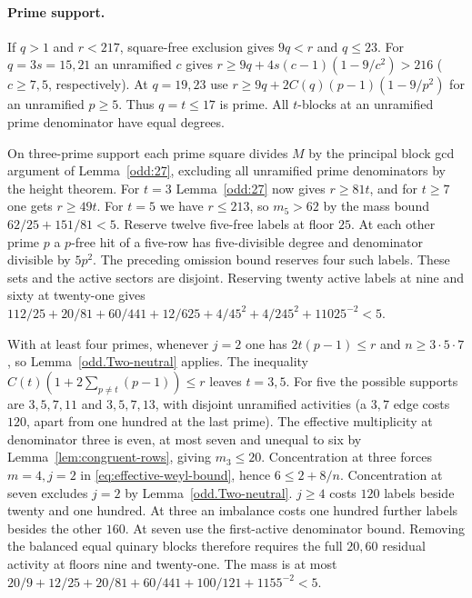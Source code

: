\documentclass[11pt]{amsart}
\numberwithin{equation}{section}
\theoremstyle{definition}
\theoremstyle{plain}
\begin{document}
\paragraph{Prime support.}
If $q>1$ and $r<217$,
square-free exclusion gives $9q<r$ and $q\le23$. For $q=3s=15,21$ an
unramified $c$ gives $r\ge9q+4s(c-1)(1-9/c^2)>216$
($c\ge7,5$, respectively). At $q=19,23$ use
$r\ge9q+2C(q)(p-1)(1-9/p^2)$ for an unramified $p\ge5$.
Thus $q=t\le17$ is prime. All $t$-blocks at an unramified prime
denominator have equal degrees.

On three-prime support each prime square divides $M$ by the principal
block gcd argument of Lemma~\ref{odd:27}, excluding all unramified
prime denominators by the height theorem. For $t=3$ Lemma~\ref{odd:27}
now gives $r\ge81t$, and for $t\ge7$ one gets $r\ge49t$.
For $t=5$ we have $r\le213$, so $m_5>62$ by the mass bound
$62/25+151/81<5$. Reserve twelve five-free labels at floor $25$.
At each other prime $p$ a $p$-free hit of a five-row has five-divisible
degree and denominator divisible by $5p^2$. The preceding omission bound
reserves four such labels. These sets and the active sectors are disjoint.
Reserving twenty active labels at nine and sixty at twenty-one gives
$112/25+20/81+60/441+12/625+4/45^2+4/245^2+11025^{-2}<5$.

With at least four primes, whenever $j=2$ one has $2t(p-1)\le r$ and $n\ge3\cdot5\cdot7$, so Lemma~\ref{odd.Two-neutral} applies. The inequality $C(t)(1+2\sum_{p\ne t}(p-1))\le r$
leaves $t=3,5$. For five the possible supports are $3,5,7,11$ and
$3,5,7,13$, with disjoint unramified activities (a $3,7$ edge costs
$120$, apart from one hundred at the last prime). The effective
multiplicity at denominator three is even, at most seven and unequal to
six by Lemma~\ref{lem:congruent-rows}, giving $m_3\le20$.
Concentration at three forces $m=4,j=2$ in \eqref{eq:effective-weyl-bound},
hence $6\le2+8/n$. Concentration at seven excludes $j=2$ by
Lemma~\ref{odd.Two-neutral}. $j\ge4$ costs $120$ labels beside
twenty and one hundred. At three an imbalance costs one hundred
further labels besides the other $160$. At seven use the first-active
denominator bound. Removing the balanced equal quinary blocks therefore
requires the full $20,60$ residual activity at floors nine and
twenty-one. The mass is at most
$20/9+12/25+20/81+60/441+100/121+1155^{-2}<5$.
\end{document}
